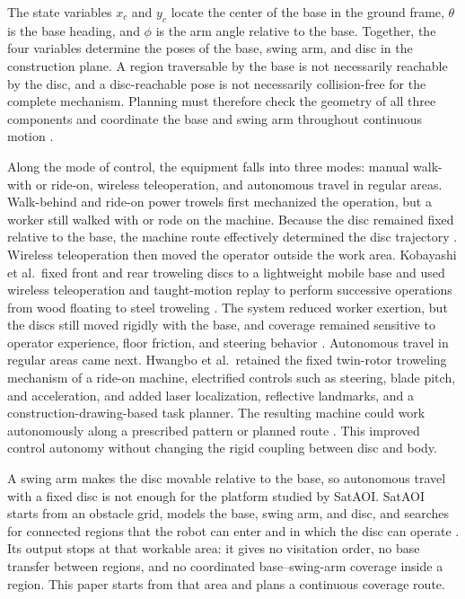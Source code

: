 The state variables $x_c$ and $y_c$ locate the center of the base in the ground frame, $\theta$ is the base heading, and $\phi$ is the arm angle relative to the base. Together, the four variables determine the poses of the base, swing arm, and disc in the construction plane. A region traversable by the base is not necessarily reachable by the disc, and a disc-reachable pose is not necessarily collision-free for the complete mechanism. Planning must therefore check the geometry of all three components and coordinate the base and swing arm throughout continuous motion \cite{lin2025}.

Along the mode of control, the equipment falls into three modes: manual walk-with or ride-on, wireless teleoperation, and autonomous travel in regular areas. Walk-behind and ride-on power trowels first mechanized the operation, but a worker still walked with or rode on the machine. Because the disc remained fixed relative to the base, the machine route effectively determined the disc trajectory \cite{hwangbo1999}. Wireless teleoperation then moved the operator outside the work area. Kobayashi et al.\ fixed front and rear troweling discs to a lightweight mobile base and used wireless teleoperation and taught-motion replay to perform successive operations from wood floating to steel troweling \cite{kobayashi1996}. The system reduced worker exertion, but the discs still moved rigidly with the base, and coverage remained sensitive to operator experience, floor friction, and steering behavior \cite{kobayashi1996}. Autonomous travel in regular areas came next. Hwangbo et al.\ retained the fixed twin-rotor troweling mechanism of a ride-on machine, electrified controls such as steering, blade pitch, and acceleration, and added laser localization, reflective landmarks, and a construction-drawing-based task planner. The resulting machine could work autonomously along a prescribed pattern or planned route \cite{hwangbo1999}. This improved control autonomy without changing the rigid coupling between disc and body.

A swing arm makes the disc movable relative to the base, so autonomous travel with a fixed disc is not enough for the platform studied by SatAOI. SatAOI starts from an obstacle grid, models the base, swing arm, and disc, and searches for connected regions that the robot can enter and in which the disc can operate \cite{lin2025}. Its output stops at that workable area: it gives no visitation order, no base transfer between regions, and no coordinated base--swing-arm coverage inside a region. This paper starts from that area and plans a continuous coverage route.

